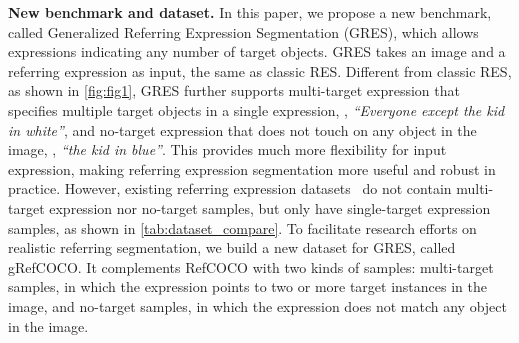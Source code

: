 \documentclass[10pt,twocolumn,letterpaper]{article}
\begin{document}
\begin{table}[t]
  \renewcommand\arraystretch{1.2}
  \centering
  \footnotesize
  \caption{Comparison among different referring expression data-sets, including ReferIt\cite{kazemzadeh-etal-2014-referitgame}, RefCOCO(g)\cite{yu2016modeling,mao2016generation}, PhraseCut\cite{wu2020phrasecut}, and our proposed \textbf{gRefCOCO}. Multi-target: expression that specifies multiple objects in the image. No-target: expression that does not touch on any object in the image.}\vspace{-3mm}
  \label{tab:dataset_compare}\vspace{-5mm}
\end{table}\textbf{New benchmark and dataset.} In this paper, we propose a new benchmark, called Generalized Referring Expression Segmentation (GRES), which allows expressions indicating any number of target objects. GRES takes an image and a referring expression as input, the same as classic RES. Different from classic RES, as shown in \cref{fig:fig1}, GRES further supports multi-target expression that specifies multiple target objects in a single expression, \eg, \textit{``Everyone except the kid in white''}, and no-target expression that does not touch on any object in the image, \eg, \textit{``the kid in blue''}. This provides much more flexibility for input expression, making referring expression segmentation more useful and robust in practice. However, existing referring expression datasets~\cite{kazemzadeh-etal-2014-referitgame,yu2016modeling,mao2016generation} do not contain multi-target expression nor no-target samples, but only have single-target expression samples, as shown in \cref{tab:dataset_compare}. To facilitate research efforts on realistic referring segmentation, we build a new dataset for GRES, called gRefCOCO. It complements RefCOCO with two kinds of samples: multi-target samples, in which the expression points to two or more target instances in the image, and no-target samples, in which the expression does not match any object in the image.
\end{document}

